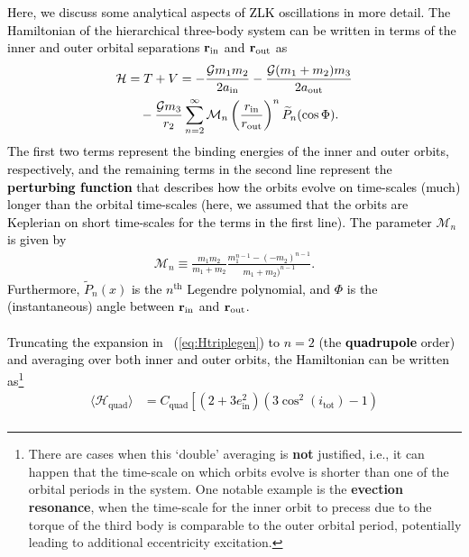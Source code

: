 \documentclass[main.tex]{subfiles}
\begin{document}
\begin{tcolorbox}[sharp corners, colback=green!30, colframe=green!80!blue, title=Orbital Dynamics VI$^{10}$]
\par \textcolor{black}{Here, we discuss some analytical aspects of ZLK oscillations in more detail. The Hamiltonian of the hierarchical three-body system can be written in terms of the inner and outer orbital separations ${\mathbf{r}}_\mathrm{in}$ and ${\mathbf{r}}_\mathrm{out}$ as
\begin{align}
\label{eq:Htriplegen}
\nonumber \mathcal{H} &= T+V = - \frac{\mathcal{G} m_1m_2}{2a_\mathrm{in}} - \frac{\mathcal{G}(m_1+m_2)m_3}{2 a_\mathrm{out}} \\
&\quad - \frac{\mathcal{G} m_3}{r_2} \sum_{n=2}^\infty \mathcal{M}_n \left ( \frac{r_\mathrm{in}}{r_\mathrm{out}} \right )^n \widetilde{P}_n(\cos \Phi).
\end{align}
The first two terms represent the binding energies of the inner and outer orbits, respectively, and the remaining terms in the second line represent the {\bf perturbing function} that describes how the orbits evolve on time-scales (much) longer than the orbital time-scales (here, we assumed that the orbits are Keplerian on short time-scales for the terms in the first line). The parameter $\mathcal{M}_n$ is given by
\begin{align}
\mathcal{M}_n \equiv \frac{m_1 m_2}{m_1+m_2}\frac{m_1^{n-1} - (-m_2)^{n-1}}{m_1+m_2)^{n-1}}.
\end{align}
Furthermore, $\widetilde{P}_n(x)$ is the $n^\mathrm{th}$ Legendre polynomial, and $\Phi$ is the (instantaneous) angle between ${\mathbf{r}}_\mathrm{in}$ and ${\mathbf{r}}_\mathrm{out}$. \\ \\
Truncating the expansion in \Eq~(\ref{eq:Htriplegen}) to $n=2$ (the {\bf quadrupole} order) and averaging over both inner and outer orbits, the Hamiltonian can be written as\footnote{There are cases when this `double' averaging is {\bf not} justified, i.e., it can happen that the time-scale on which orbits evolve is shorter than one of the orbital periods in the system. One notable example is the {\bf evection resonance}, when the time-scale for the inner orbit to precess due to the torque of the third body is comparable to the outer orbital period, potentially leading to additional eccentricity excitation. }
\begin{align}
\label{eq:Htriplequadav}
\nonumber \langle \mathcal{H}_\mathrm{quad}\rangle &= C_\mathrm{quad} \left [ \left (2 + 3 e_\mathrm{in}^2 \right ) \left (3 \cos^2(i_\mathrm{tot}) - 1 \right ) \right. \\

\end{align}}
\end{tcolorbox}
\end{document}
